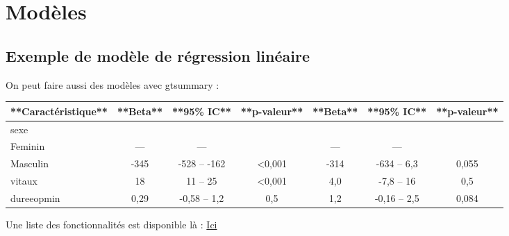 \documentclass[
]{book}
\newenvironment{Shaded}{\begin{snugshade}}{\end{snugshade}}
\newcommand{\AttributeTok}[1]{\textcolor[rgb]{0.13,0.29,0.53}{#1}}
\newcommand{\FunctionTok}[1]{\textcolor[rgb]{0.13,0.29,0.53}{\textbf{#1}}}
\newcommand{\NormalTok}[1]{#1}
\newcommand{\SpecialCharTok}[1]{\textcolor[rgb]{0.81,0.36,0.00}{\textbf{#1}}}
\newcommand{\StringTok}[1]{\textcolor[rgb]{0.31,0.60,0.02}{#1}}
\begin{document}
\section{Modèles}\label{moduxe8les}

\subsection{Exemple de modèle de régression linéaire}\label{exemple-de-moduxe8le-de-ruxe9gression-linuxe9aire}

On peut faire aussi des modèles avec gtsummary :

\begin{Shaded}
\end{Shaded}

\begin{tabular}{l|c|c|c|c|c|c}
\hline
**Caractéristique** & **Beta** & **95\% IC** & **p-valeur** & **Beta** & **95\% IC** & **p-valeur**\\
\hline
sexe &  &  &  &  &  & \\
\hline
Feminin & — & — &  & — & — & \\
\hline
Masculin & -345 & -528 – -162 & <0,001 & -314 & -634 – 6,3 & 0,055\\
\hline
vitaux & 18 & 11 – 25 & <0,001 & 4,0 & -7,8 – 16 & 0,5\\
\hline
dureeopmin & 0,29 & -0,58 – 1,2 & 0,5 & 1,2 & -0,16 – 2,5 & 0,084\\
\hline
\end{tabular}

Une liste des fonctionnalités est disponible là :
\href{https://www.danieldsjoberg.com/gtsummary/reference/theme_gtsummary.html\#examples}{Ici}
\end{document}
